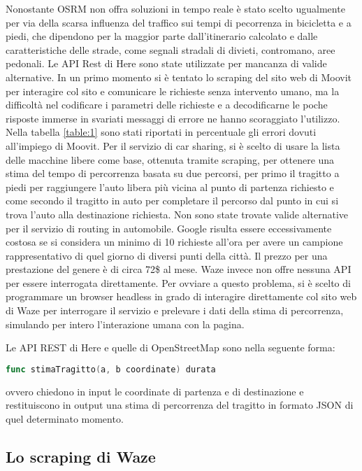 Nonostante OSRM non offra soluzioni in tempo reale è stato scelto ugualmente per via della scarsa influenza del traffico sui tempi di pecorrenza in bicicletta e a piedi, che dipendono per la maggior parte dall'itinerario calcolato e dalle caratteristiche delle strade, come segnali stradali di divieti, contromano, aree pedonali. Le API Rest di Here sono state utilizzate per mancanza di valide alternative. In un primo momento si è tentato lo scraping del sito web di Moovit per interagire col sito e comunicare le richieste senza intervento umano, ma la difficoltà nel codificare i parametri delle richieste e a decodificarne le poche risposte immerse in svariati messaggi di errore ne hanno scoraggiato l'utilizzo. Nella tabella \ref{table:1} sono stati riportati in percentuale gli errori dovuti all'impiego di Moovit. Per il servizio di car sharing, si è scelto di usare la lista delle macchine libere come base, ottenuta tramite scraping, per ottenere una stima del tempo di percorrenza basata su due percorsi, per primo il tragitto a piedi per raggiungere l'auto libera più vicina al punto di partenza richiesto e come secondo il tragitto in auto per completare il percorso dal punto in cui si trova l'auto alla destinazione richiesta. Non sono state trovate valide alternative per il servizio di routing in automobile. Google risulta essere eccessivamente costosa se si considera un minimo di 10 richieste all'ora per avere un campione rappresentativo di quel giorno di diversi punti della città. Il prezzo per una prestazione del genere è di circa 72\$ al mese. Waze invece non offre nessuna API per essere interrogata direttamente. Per ovviare a questo problema, si è scelto di programmare un browser headless in grado di interagire direttamente col sito web di Waze per interrogare il servizio e prelevare i dati della stima di percorrenza, simulando per intero l'interazione umana con la pagina.

Le API REST di Here e quelle di OpenStreetMap sono nella seguente forma:
\begin{lstlisting}[language=Go]
func stimaTragitto(a, b coordinate) durata
\end{lstlisting}
ovvero chiedono in input le coordinate di partenza e di destinazione e restituiscono in output una stima di percorrenza del tragitto in formato JSON di quel determinato momento.

\subsection{Lo scraping di Waze}

